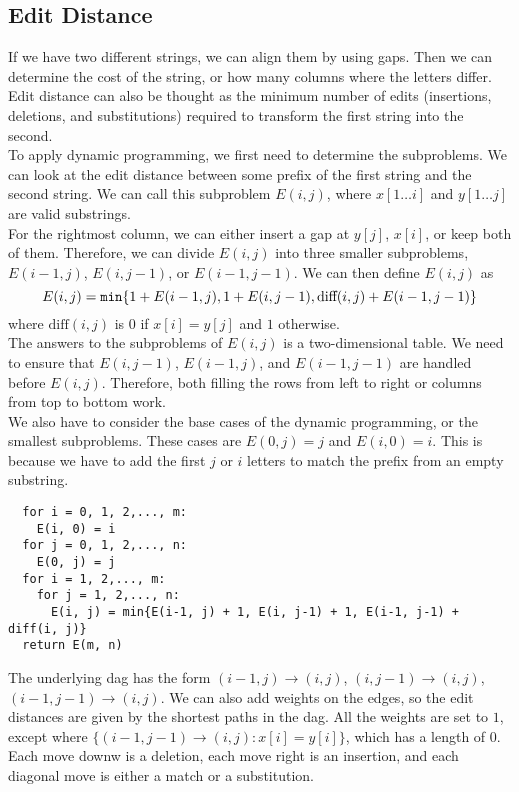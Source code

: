 \subsection{Edit Distance}
If we have two different strings, we can align them by using gaps.
Then we can determine the cost of the string, or how many columns where the letters differ.
Edit distance can also be thought as the minimum number of edits (insertions, deletions, and substitutions) required to transform the first string into the second.\\
To apply dynamic programming, we first need to determine the subproblems.
We can look at the edit distance between some prefix of the first string and the second string.
We can call this subproblem $E(i, j)$, where $x[1\ldots i]$ and $y[1 \ldots j]$ are valid substrings.\\
For the rightmost column, we can either insert a gap at $y[j]$, $x[i]$, or keep both of them.
Therefore, we can divide $E(i, j)$ into three smaller subproblems, $E(i-1, j)$, $E(i, j-1)$, or $E(i-1, j-1)$.
We can then define $E(i, j)$ as $$E(i, j) = \verb|min|\{1 + E(i-1, j), 1 + E(i, j-1), \text{diff}(i, j) + E(i-1, j-1)\}$$
where $\text{diff}(i, j)$ is $0$ if $x[i] = y[j]$ and $1$ otherwise.\\
The answers to the subproblems of $E(i, j)$ is a two-dimensional table.
We need to ensure that $E(i, j-1)$, $E(i-1, j)$, and $E(i-1, j-1)$ are handled before $E(i, j)$.
Therefore, both filling the rows from left to right or columns from top to bottom work.\\
We also have to consider the base cases of the dynamic programming, or the smallest subproblems.
These cases are $E(0, j) = j$ and $E(i, 0) = i$.
This is because we have to add the first $j$ or $i$ letters to match the prefix from an empty substring.
\begin{verbatim}
  for i = 0, 1, 2,..., m:
    E(i, 0) = i
  for j = 0, 1, 2,..., n:
    E(0, j) = j
  for i = 1, 2,..., m:
    for j = 1, 2,..., n:
      E(i, j) = min{E(i-1, j) + 1, E(i, j-1) + 1, E(i-1, j-1) + diff(i, j)}
  return E(m, n)
\end{verbatim}
The underlying dag has the form $(i-1, j) \rightarrow (i, j)$, $(i, j-1) \rightarrow (i, j)$, $(i-1, j-1) \rightarrow (i, j)$.
We can also add weights on the edges, so the edit distances are given by the shortest paths in the dag.
All the weights are set to $1$, except where $\{(i-1, j-1) \rightarrow (i, j) : x[i] = y[i]\}$, which has a length of $0$.
Each move downw is a deletion, each move right is an insertion, and each diagonal move is either a match or a substitution.

